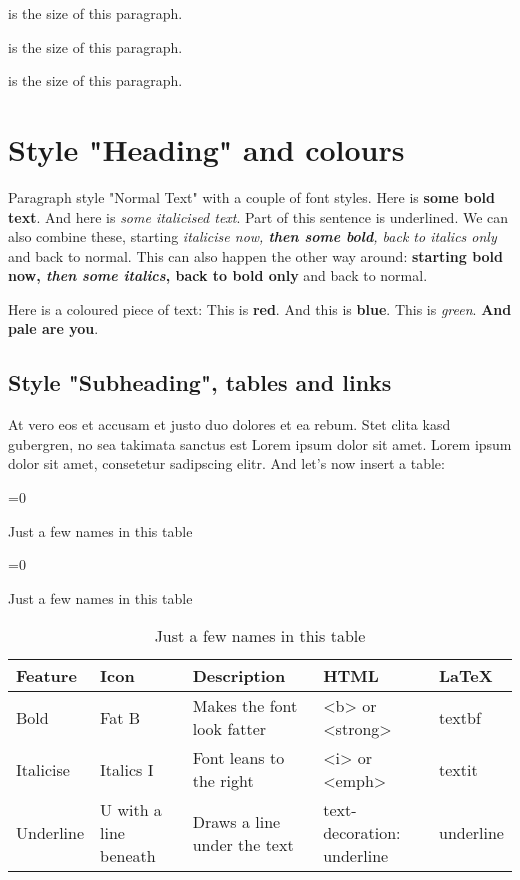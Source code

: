 {\FontSizeTwentysixPT 26pt is the size of this paragraph.}

{\FontSizeTwentyeightPT 28pt is the size of this paragraph.}

{\FontSizeThirtyPT 30pt is the size of this paragraph.}

\chapter{Style "Heading" and colours}

Paragraph style "Normal Text" with a couple of font
styles. Here is 
\textbf{some bold text}. And here is 
\textit{some italicised text}. 
Part of this sentence is underlined. 
We can also combine these, starting 
\textit{italicise now, \textbf{then some bold}, back to italics only} and back to normal. This can
also happen the other way around: 
\textbf{starting bold now, \textit{then some italics}, back to bold only} and
back to normal.

Here is a coloured piece of text: 
\textcolor[rgb]{1,0,0}{This is \textbf{red}.}
\textcolor[rgb]{0,0,1}{And this is \textbf{blue}.}
\textcolor[rgb]{0,1,0}{This is \textit{green}.}
\textcolor[rgb]{0.5,0.5,0.5}{\textbf{And pale are you}.}

\section{Style "Subheading", tables and links}
At vero eos et accusam et justo duo dolores et ea rebum. Stet
clita kasd gubergren, no sea takimata sanctus est Lorem ipsum dolor
sit amet. Lorem ipsum dolor sit amet, consetetur sadipscing elitr.
And let's now insert a table:

\noindent
\begin{table}[H]
	\ifnum{}=0 
		\caption*{Just a few names in this table}
	\else
		\ifnum{}=0 
			\caption*{Just a few names in this table}
		\else
			\caption{Just a few names in this table} 
		\fi
	\fi
	\begin{center}
		\begin{tabular}{lllll}
			\toprule
			Feature & Icon & Description & HTML & LaTeX \\
			\midrule
			Bold & Fat B & Makes the font look fatter & <b> or <strong> & textbf \\
			Italicise & Italics I & Font leans to the right & <i> or <emph> & textit \\
			Underline & U with a line beneath & Draws a line under the text & text-decoration: underline & underline \\
			\bottomrule
		\end{tabular}
	\end{center}
\end{table}
		
